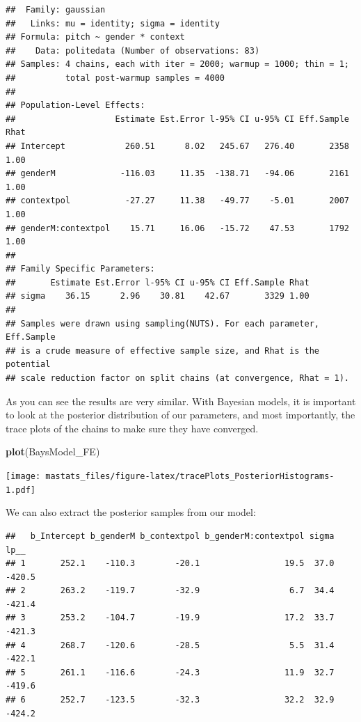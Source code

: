 \documentclass[]{book}
\newenvironment{Shaded}{\begin{snugshade}}{\end{snugshade}}
\newcommand{\CommentTok}[1]{\textcolor[rgb]{0.56,0.35,0.01}{\textit{#1}}}
\newcommand{\DecValTok}[1]{\textcolor[rgb]{0.00,0.00,0.81}{#1}}
\newcommand{\KeywordTok}[1]{\textcolor[rgb]{0.13,0.29,0.53}{\textbf{#1}}}
\newcommand{\NormalTok}[1]{#1}
\newcommand{\OperatorTok}[1]{\textcolor[rgb]{0.81,0.36,0.00}{\textbf{#1}}}
\newcommand{\StringTok}[1]{\textcolor[rgb]{0.31,0.60,0.02}{#1}}
\begin{document}
\begin{verbatim}
##  Family: gaussian 
##   Links: mu = identity; sigma = identity 
## Formula: pitch ~ gender * context 
##    Data: politedata (Number of observations: 83) 
## Samples: 4 chains, each with iter = 2000; warmup = 1000; thin = 1;
##          total post-warmup samples = 4000
## 
## Population-Level Effects: 
##                    Estimate Est.Error l-95% CI u-95% CI Eff.Sample Rhat
## Intercept            260.51      8.02   245.67   276.40       2358 1.00
## genderM             -116.03     11.35  -138.71   -94.06       2161 1.00
## contextpol           -27.27     11.38   -49.77    -5.01       2007 1.00
## genderM:contextpol    15.71     16.06   -15.72    47.53       1792 1.00
## 
## Family Specific Parameters: 
##       Estimate Est.Error l-95% CI u-95% CI Eff.Sample Rhat
## sigma    36.15      2.96    30.81    42.67       3329 1.00
## 
## Samples were drawn using sampling(NUTS). For each parameter, Eff.Sample 
## is a crude measure of effective sample size, and Rhat is the potential 
## scale reduction factor on split chains (at convergence, Rhat = 1).
\end{verbatim}

As you can see the results are very similar. With Bayesian models, it is important to look at the posterior distribution of our parameters, and most importantly, the trace plots of the chains to make sure they have converged.

\begin{Shaded}
\begin{Highlighting}[]
\KeywordTok{plot}\NormalTok{(BaysModel_FE)}
\end{Highlighting}
\end{Shaded}

\texttt{[image: mastats\_files/figure-latex/tracePlots\_PosteriorHistograms-1.pdf]}

We can also extract the posterior samples from our model:

\begin{Shaded}
\end{Shaded}

\begin{verbatim}
##   b_Intercept b_genderM b_contextpol b_genderM:contextpol sigma   lp__
## 1       252.1    -110.3        -20.1                 19.5  37.0 -420.5
## 2       263.2    -119.7        -32.9                  6.7  34.4 -421.4
## 3       253.2    -104.7        -19.9                 17.2  33.7 -421.3
## 4       268.7    -120.6        -28.5                  5.5  31.4 -422.1
## 5       261.1    -116.6        -24.3                 11.9  32.7 -419.6
## 6       252.7    -123.5        -32.3                 32.2  32.9 -424.2
\end{verbatim}
\end{document}
